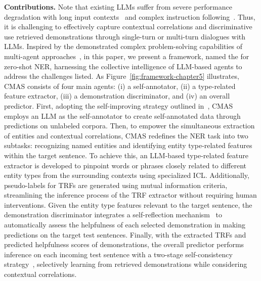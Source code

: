
\noindent \textbf{Contributions.}
Note that existing \acp{LLM} suffer from severe performance degradation with long input contexts~\citep{DBLP:journals/tacl/LiuLHPBPL24,jinllm} and complex instruction following~\citep{DBLP:journals/corr/abs-2402-18243,DBLP:journals/corr/abs-2401-03601}. 
Thus, it is challenging to effectively capture contextual correlations and discriminative use retrieved demonstrations through single-turn or multi-turn dialogues with \acp{LLM}.
Inspired by the demonstrated complex problem-solving capabilities of multi-agent approaches~\citep{DBLP:journals/corr/abs-2309-07864,DBLP:journals/corr/abs-2402-01680}, in this paper, we present a framework, named the  for zero-shot \ac{NER}, harnessing the collective intelligence of LLM-based agents to address the challenges listed.
As Figure~\ref{fig:framework-chapter5} illustrates, \ac{CMAS}  consists of four main agents: (i) a self-annotator, (ii) a type-related feature extractor, (iii) a demonstration discriminator, and (iv) an overall predictor.
First, adopting the self-improving strategy outlined in~\citep{DBLP:journals/corr/abs-2311-08921}, \ac{CMAS} employs an \ac{LLM} as the self-annotator to create self-annotated data through predictions on unlabeled corpora.
Then, to empower the simultaneous extraction of entities and contextual correlations, \ac{CMAS} redefines the \ac{NER} task into two subtasks: recognizing named entities and identifying entity type-related features within the target sentence.
To achieve this, an \ac{LLM}-based type-related feature extractor is developed to pinpoint words or phrases closely related to different entity types from the surrounding contexts using specialized \acf{ICL}.
Additionally, pseudo-labels for \acp{TRF} are generated using mutual information criteria, streamlining the inference process of the \ac{TRF} extractor without requiring human interventions.
Given the entity type features relevant to the target sentence, the demonstration discriminator integrates a self-reflection mechanism~\citep{DBLP:conf/iclr/AsaiWWSH24} to automatically assess the helpfulness of each selected demonstration in making predictions on the target test sentences.
Finally, with the extracted \acp{TRF} and predicted helpfulness scores of demonstrations, the overall predictor performs inference on each incoming test sentence with a two-stage self-consistency strategy~\citep{wang2022self,DBLP:conf/emnlp/XieLZZLW23}, selectively learning from retrieved demonstrations while considering contextual correlations.
